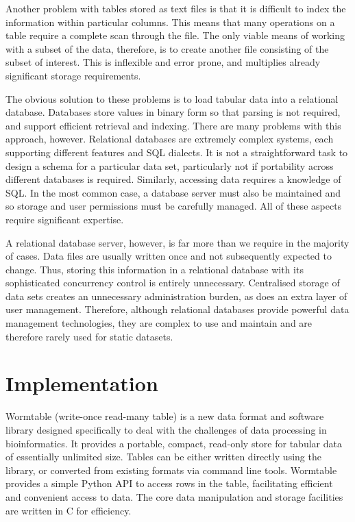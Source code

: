 \documentclass[10pt]{bmc_article}
\newenvironment{bmcformat}{\begin{raggedright}\baselineskip20pt\sloppy\setboolean{publ}{false}}{\end{raggedright}\baselineskip20pt\sloppy}
\begin{document}
\begin{bmcformat}
Another problem with tables stored as text files is that it is difficult 
to index the information within particular columns. 
This means that many operations on a table require a complete scan 
through the file. The only viable means of 
working with a subset of the data, therefore, 
is to create another file consisting of the subset of interest. 
This is inflexible and error prone, and multiplies already significant  
storage requirements.

The obvious solution to these problems is to load tabular data into a
relational database. Databases store values in binary form so that parsing is 
not required, and support efficient retrieval and indexing. There 
are many problems with this approach, however. Relational databases are 
extremely complex systems, each supporting different features and SQL 
dialects. It is not a straightforward task to design a schema for a 
particular data set, particularly not if portability across different 
databases is required. Similarly, accessing data requires a knowledge
of SQL. In the most common case, a database server must also be maintained
and so storage and user permissions must be carefully managed. All of 
these aspects require significant expertise.

A relational database server, however, is far more than we require in the 
majority of cases. Data files are usually written once and 
not subsequently expected to change.
Thus, storing this information 
in a relational database with its sophisticated concurrency control
is entirely unnecessary. Centralised storage of data sets
creates an unnecessary administration burden, as does an extra
layer of user management. Therefore, although relational databases
provide powerful data management technologies, they are complex
to use and maintain and are therefore rarely used for 
static datasets.

\section*{Implementation}

Wormtable (write-once read-many table) 
is a new data format and software library designed specifically
to deal with the challenges of data processing in bioinformatics.
It provides a portable, compact, read-only store for tabular
data of essentially unlimited size. Tables can
be either written directly using the library, or converted
from existing formats via command line tools. 
Wormtable provides a simple Python API to access rows
in the table, facilitating efficient and convenient access to 
data. The core data manipulation and storage facilities 
are written in C for efficiency.


\end{bmcformat}
\end{document}

